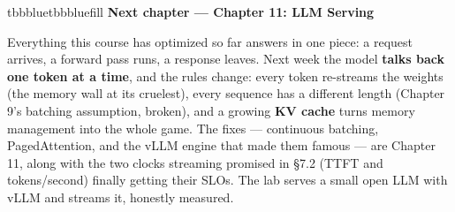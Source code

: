 \begin{calloutbox}{tbbblue}{tbbbluefill}
{\normalsize\bfseries\color{tbbblue}Next chapter — Chapter 11: LLM Serving}\par\vspace{3pt}
Everything this course has optimized so far answers in one piece: a request arrives, a forward pass runs, a response leaves. Next week the model \textbf{talks back one token at a time}, and the rules change: every token re-streams the weights (the memory wall at its cruelest), every sequence has a different length (Chapter 9's batching assumption, broken), and a growing \textbf{KV cache} turns memory management into the whole game. The fixes — continuous batching, PagedAttention, and the vLLM engine that made them famous — are Chapter 11, along with the two clocks streaming promised in §7.2 (TTFT and tokens/second) finally getting their SLOs. The lab serves a small open LLM with vLLM and streams it, honestly measured.
\end{calloutbox}
